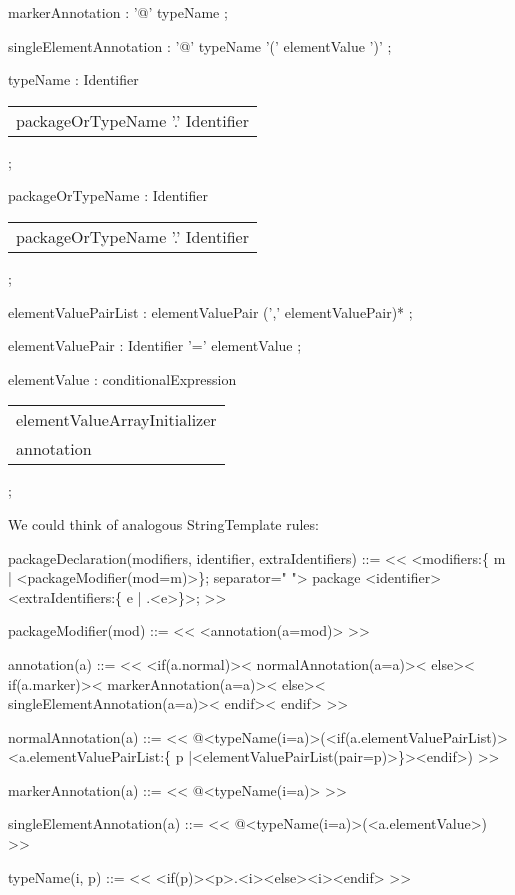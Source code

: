 \documentclass[11pt]{article}
\begin{document}
markerAnnotation
:        '@' typeName
;

singleElementAnnotation
:        '@' typeName '(' elementValue ')'
;

typeName
:        Identifier
\begin{center}
\begin{tabular}{l}
packageOrTypeName '.' Identifier\\
\end{tabular}
\end{center}
;

packageOrTypeName
:        Identifier
\begin{center}
\begin{tabular}{l}
packageOrTypeName '.' Identifier\\
\end{tabular}
\end{center}
;

elementValuePairList
:        elementValuePair (',' elementValuePair)*
;

elementValuePair
:        Identifier '=' elementValue
;

elementValue
:        conditionalExpression
\begin{center}
\begin{tabular}{l}
elementValueArrayInitializer\\
annotation\\
\end{tabular}
\end{center}
;

We could think of analogous StringTemplate rules:

packageDeclaration(modifiers, identifier, extraIdentifiers) ::= <<
<modifiers:\{ m | <packageModifier(mod=m)>\}; separator=" "> package <identifier><extraIdentifiers:\{ e | .<e>\}>;
>>

packageModifier(mod) ::= <<
<annotation(a=mod)>
>>

annotation(a) ::= <<
<if(a.normal)><
  normalAnnotation(a=a)><
else><
  if(a.marker)><
    markerAnnotation(a=a)><
  else><
    singleElementAnnotation(a=a)><
  endif><
endif>
>>

normalAnnotation(a) ::= <<
@<typeName(i=a)>(<if(a.elementValuePairList)><a.elementValuePairList:\{ p |<elementValuePairList(pair=p)>\}><endif>)
>>

markerAnnotation(a) ::= <<
@<typeName(i=a)>
>>

singleElementAnnotation(a) ::= <<
@<typeName(i=a)>(<a.elementValue>)
>>

typeName(i, p) ::= <<
<if(p)><p>.<i><else><i><endif>
>>
\end{document}
